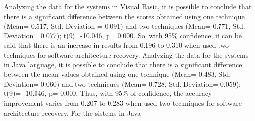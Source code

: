 \documentclass{sig-alternate-05-2015}
\begin{document}
Analyzing the data for the systems in Visual Basic, it is possible to conclude that there is a significant difference between the scores obtained using one technique (Mean= 0.517, Std. Deviation = 0.091) and two techniques (Mean= 0.771, Std. Deviation= 0.077); t(9)=-10.046, p= 0.000. So, with 95\% confidence, it can be said that there is an increase in results from 0.196 to 0.310 when used two techniques for software architecture recovery. Analyzing the data for the systems in Java language, it is possible to conclude that there is a significant difference between the mean values obtained using one technique (Mean= 0.483, Std. Deviation= 0.060) and two techniques (Mean= 0.728, Std. Deviation= 0.059); t(9)= -10.046, p= 0.000. Thus, with 95\% of confidence, the accuracy improvement varies from 0.207 to 0.283 when used two techniques for software architecture recovery. For the sistems in Java
\end{document}
